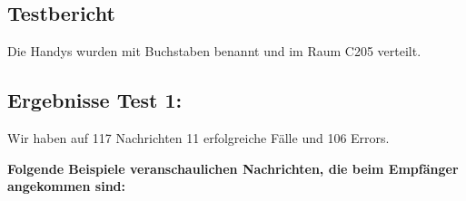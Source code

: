 \clearpage\subsection{Testbericht}\label{testbericht}

Die Handys wurden mit Buchstaben benannt und im Raum C205 verteilt.

\clearpage\subsection{Ergebnisse Test 1:}\label{ergebnisse-test-1}

Wir haben auf 117 Nachrichten 11 erfolgreiche Fälle und 106 Errors.

\textbf{Folgende Beispiele veranschaulichen Nachrichten, die beim
Empfänger angekommen sind:}


